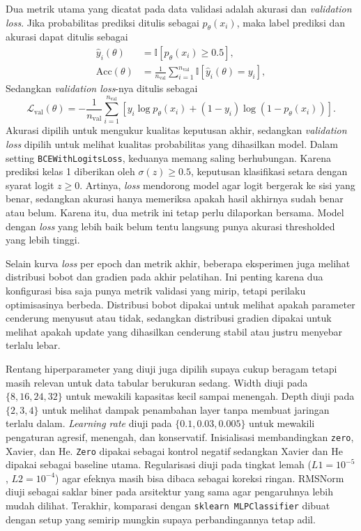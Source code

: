 \documentclass{article}
\begin{document}
Dua metrik utama yang dicatat pada data validasi adalah akurasi dan \textit{validation loss}. Jika probabilitas prediksi ditulis sebagai $p_\theta(x_i)$, maka label prediksi dan akurasi dapat ditulis sebagai
\begin{align}
\hat{y}_i(\theta) &= \mathbb{I}\!\left[p_\theta(x_i)\ge 0.5\right],\\
\mathrm{Acc}(\theta) &= \frac{1}{n_{\mathrm{val}}}\sum_{i=1}^{n_{\mathrm{val}}}\mathbb{I}\!\left[\hat{y}_i(\theta)=y_i\right],
\end{align}
Sedangkan \textit{validation loss}-nya ditulis sebagai
\begin{equation}
\mathcal{L}_{\mathrm{val}}(\theta)=
-\frac{1}{n_{\mathrm{val}}}\sum_{i=1}^{n_{\mathrm{val}}}
\left[y_i\log p_\theta(x_i)+(1-y_i)\log \left(1-p_\theta(x_i)\right)\right].
\end{equation}
Akurasi dipilih untuk mengukur kualitas keputusan akhir, sedangkan \textit{validation loss} dipilih untuk melihat kualitas probabilitas yang dihasilkan model. Dalam setting \texttt{BCEWithLogitsLoss}, keduanya memang saling berhubungan. Karena prediksi kelas 1 diberikan oleh $\sigma(z)\ge 0.5$, keputusan klasifikasi setara dengan syarat logit $z\ge 0$. Artinya, \textit{loss} mendorong model agar logit bergerak ke sisi yang benar, sedangkan akurasi hanya memeriksa apakah hasil akhirnya sudah benar atau belum. Karena itu, dua metrik ini tetap perlu dilaporkan bersama. Model dengan \textit{loss} yang lebih baik belum tentu langsung punya akurasi thresholded yang lebih tinggi.

Selain kurva \textit{loss} per epoch dan metrik akhir, beberapa eksperimen juga melihat distribusi bobot dan gradien pada akhir pelatihan. Ini penting karena dua konfigurasi bisa saja punya metrik validasi yang mirip, tetapi perilaku optimisasinya berbeda. Distribusi bobot dipakai untuk melihat apakah parameter cenderung menyusut atau tidak, sedangkan distribusi gradien dipakai untuk melihat apakah update yang dihasilkan cenderung stabil atau justru menyebar terlalu lebar.

Rentang hiperparameter yang diuji juga dipilih supaya cukup beragam tetapi masih relevan untuk data tabular berukuran sedang. Width diuji pada $\{8,16,24,32\}$ untuk mewakili kapasitas kecil sampai menengah. Depth diuji pada $\{2,3,4\}$ untuk melihat dampak penambahan layer tanpa membuat jaringan terlalu dalam. \textit{Learning rate} diuji pada $\{0.1,0.03,0.005\}$ untuk mewakili pengaturan agresif, menengah, dan konservatif. Inisialisasi membandingkan \texttt{zero}, Xavier, dan He. \texttt{Zero} dipakai sebagai kontrol negatif sedangkan Xavier dan He dipakai sebagai baseline utama. Regularisasi diuji pada tingkat lemah (\(L1=10^{-5}\), \(L2=10^{-4}\)) agar efeknya masih bisa dibaca sebagai koreksi ringan. RMSNorm diuji sebagai saklar biner pada arsitektur yang sama agar pengaruhnya lebih mudah dilihat. Terakhir, komparasi dengan \texttt{sklearn MLPClassifier} dibuat dengan setup yang semirip mungkin supaya perbandingannya tetap adil.
\end{document}

